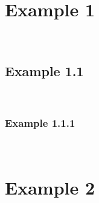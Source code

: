 \section{Example 1}
\blindtext \\

\subsection{Example 1.1}
\blindtext \\

\subsubsection{Example 1.1.1}
\blindtext \\

\section{Example 2}
\blindtext